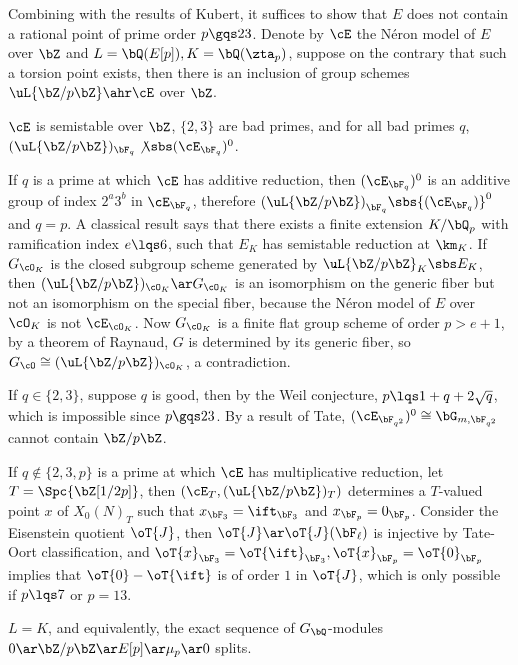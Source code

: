 \documentclass[a4paper, twoside]{article}
\begin{document}
\begin{prf}
	Combining with the results of Kubert\cite[Theorem~IV.1.2]{Kubert1976}, it suffices to show that $E$ does not contain a rational point of prime order $p\gqs23$. Denote by $\cE$ the N{\'e}ron model of $E$ over $\bZ$ and $L=\bQ(E[p]), K=\bQ(\zta_{p})$, suppose on the contrary that such a torsion point exists, then there is an inclusion of group schemes $\uL{\bZ/p\bZ}\ahr\cE$ over $\bZ$.

	 $\cE$ is semistable over $\bZ$, $\{2,3\}$ are bad primes, and for all bad primes $q$, $(\uL{\bZ/p\bZ})_{\bF_{q}}\not\sbs(\cE_{\bF_{q}})^{0}$.

	If $q$ is a prime at which $\cE$ has additive reduction, then $(\cE_{\bF_{q}})^{0}$ is an additive group of index $2^{a}3^{b}$ in $\cE_{\bF_{q}}$, therefore ${(\uL{\bZ/p\bZ})}_{\bF_{q}}\sbs{(\cE_{\bF_{q}})}^{0}$ and $q=p$. A classical result says that there exists a finite extension $K/\bQ_{p}$ with ramification index $e\lqs6$, such that $E_{K}$ has semistable reduction at $\km_{K}$. If $G_{\cO_{K}}$ is the closed subgroup scheme generated by $\uL{\bZ/p\bZ}_{K}\sbs E_{K}$, then $(\uL{\bZ/p\bZ})_{\cO_{K}}\ar G_{\cO_{K}}$ is an isomorphism on the generic fiber but not an isomorphism on the special fiber, because the N{\'e}ron model of $E$ over $\cO_{K}$ is not $\cE_{\cO_{K}}$. Now $G_{\cO_{K}}$ is a finite flat group scheme of order $p>e+1$, by a theorem of Raynaud, $G$ is determined by its generic fiber, so $G_{\cO}\cong(\uL{\bZ/p\bZ})_{\cO_{K}}$, a contradiction.

	If $q\in\{2,3\}$, suppose $q$ is good, then by the Weil conjecture, $p\lqs1+q+2\sqrt{q}$, which is impossible since $p\gqs23$. By a result of Tate, $(\cE_{\bF_{q^{2}}})^{0}\cong\bG_{m,\bF_{q^{2}}}$ cannot contain $\bZ/p\bZ$.

	If $q\nin\{2,3,p\}$ is a prime at which $\cE$ has multiplicative reduction, let $T=\Spc{\bZ[1/2p]}$, then $(\cE_{T},(\uL{\bZ/p\bZ})_{T})$ determines a $T$-valued point $x$ of $X_{0}(N)_{T}$ such that $x_{\bF_{3}}=\ift_{\bF_{3}}$ and $x_{\bF_{p}}=0_{\bF_{p}}$. Consider the Eisenstein quotient $\oT{J}$, then $\oT{J}\ar\oT{J}(\bF_{\ell})$ is injective by Tate-Oort classification, and $\oT{x}_{\bF_{3}}=\oT{\ift}_{\bF_{3}}, \oT{x}_{\bF_{p}}=\oT{0}_{\bF_{p}}$ implies that $\oT{0}-\oT{\ift}$ is of order $1$ in $\oT{J}$, which is only possible if $p\lqs7$ or $p=13$.

	 $L=K$, and equivalently, the exact sequence of $G_{\bQ}$-modules $0\ar\bZ/p\bZ\ar E[p]\ar \mu_{p}\ar 0$ splits.


\end{prf}
\end{document}

